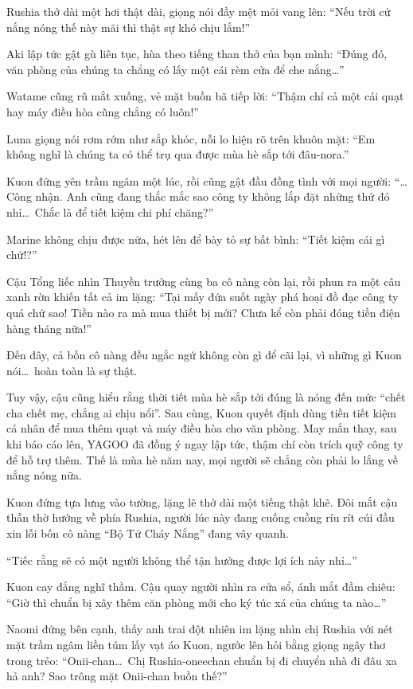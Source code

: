 \documentclass[../main.tex]{subfiles}
\begin{document}
Rushia thở dài một hơi thật dài, giọng nói đầy mệt mỏi vang lên: ``Nếu trời cứ nắng nóng thế này mãi thì thật sự khó chịu lắm!''

Aki lập tức gật gù liên tục, hùa theo tiếng than thở của bạn mình: ``Đúng đó, văn phòng của chúng ta chẳng có lấy một cái rèm cửa để che nắng\dots''

Watame cũng rũ mắt xuống, vẻ mặt buồn bã tiếp lời: ``Thậm chí cả một cái quạt hay máy điều hòa cũng chẳng có luôn!''

Luna giọng nói rơm rớm như sắp khóc, nỗi lo hiện rõ trên khuôn mặt: ``Em không nghĩ là chúng ta có thể trụ qua được mùa hè sắp tới đâu-nora.''

Kuon đứng yên trầm ngâm một lúc, rồi cũng gật đầu đồng tình với mọi người: ``\dots Công nhận. Anh cũng đang thắc mắc sao công ty không lắp đặt những thứ đó nhỉ\dots\ Chắc là để tiết kiệm chi phí chăng?''

Marine không chịu được nữa, hét lên để bày tỏ sự bất bình: ``Tiết kiệm cái gì chứ!?''

Cậu Tổng liếc nhìn Thuyền trưởng cùng ba cô nàng còn lại, rồi phun ra một câu xanh rờn khiến tất cả im lặng: ``Tại mấy đứa suốt ngày phá hoại đồ đạc công ty quá chứ sao! Tiền nào ra mà mua thiết bị mới? Chưa kể còn phải đóng tiền điện hàng tháng nữa!''

Đến đây, cả bốn cô nàng đều ngắc ngứ không còn gì để cãi lại, vì những gì Kuon nói\dots\ hoàn toàn là sự thật.

Tuy vậy, cậu cũng hiểu rằng thời tiết mùa hè sắp tới đúng là nóng đến mức ``chết cha chết mẹ, chẳng ai chịu nổi''. Sau cùng, Kuon quyết định dùng tiền tiết kiệm cá nhân để mua thêm quạt và máy điều hòa cho văn phòng. May mắn thay, sau khi báo cáo lên, YAGOO đã đồng ý ngay lập tức, thậm chí còn trích quỹ công ty để hỗ trợ thêm. Thế là mùa hè năm nay, mọi người sẽ chẳng còn phải lo lắng về nắng nóng nữa.

Kuon đứng tựa lưng vào tường, lặng lẽ thở dài một tiếng thật khẽ. Đôi mắt cậu thẫn thờ hướng về phía Rushia, người lúc này đang cuống cuồng ríu rít cúi đầu xin lỗi bốn cô nàng ``Bộ Tứ Cháy Nắng'' đang vây quanh.

``Tiếc rằng sẽ có một người không thể tận hưởng được lợi ích này nhỉ\dots''

Kuon cay đắng nghĩ thầm. Cậu quay người nhìn ra cửa sổ, ánh mắt đầm chiêu: ``Giờ thì chuẩn bị xây thêm căn phòng mới cho ký túc xá của chúng ta nào\dots''

Naomi đứng bên cạnh, thấy anh trai đột nhiên im lặng nhìn chị Rushia với nét mặt trầm ngâm liền túm lấy vạt áo Kuon, ngước lên hỏi bằng giọng ngây thơ trong trẻo: ``Onii-chan\dots\ Chị Rushia-oneechan chuẩn bị đi chuyển nhà đi đâu xa hả anh? Sao trông mặt Onii-chan buồn thế?''
\end{document}
